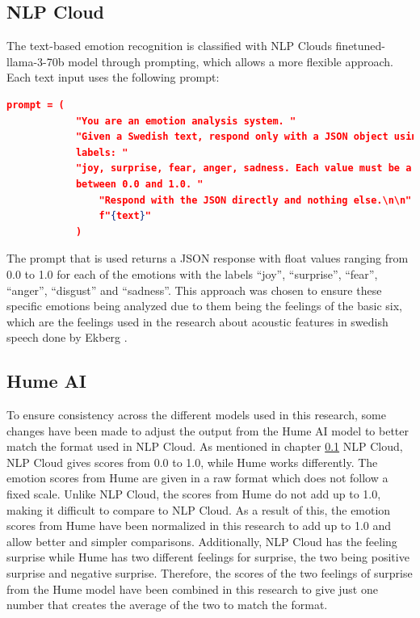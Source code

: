 \subsection{NLP Cloud}
\label{sec:method-nlp}
The text-based emotion recognition is classified with NLP Clouds finetuned-llama-3-70b model
through prompting, which allows a more flexible approach.
Each text input uses the following prompt:
\begin{center}
    \begin{minipage}{0.7\textwidth} 
    \begin{lstlisting}[language=json, caption={NLP Cloud configuration prompt.}]
        prompt = (
            "You are an emotion analysis system. "
            "Given a Swedish text, respond only with a JSON object using these emotion
            labels: "
            "joy, surprise, fear, anger, sadness. Each value must be a float
            between 0.0 and 1.0. "
                "Respond with the JSON directly and nothing else.\n\n"
                f"{text}"
            )
    \end{lstlisting}
    \end{minipage}
\end{center} 
The prompt that is used returns a JSON response with float values ranging from 0.0 to 1.0 for each of
the emotions with the labels “joy”, “surprise”, “fear”, “anger”, “disgust” and “sadness”. This approach
was chosen to ensure these specific emotions being analyzed due to them being the feelings of the basic
six, which are the feelings used in the research about acoustic features in swedish speech done by
Ekberg \autocite{Ekberg2023}. 

\subsection{Hume AI}
To ensure consistency across the different models used in this research, some changes have been
made to adjust the output from the Hume AI model to better match the format used in NLP Cloud.
As mentioned in chapter \ref{sec:method-nlp} NLP Cloud, NLP Cloud gives scores from 0.0 to 1.0, while Hume
works differently. The emotion scores from Hume are given in a raw format which does not follow a
fixed scale. Unlike NLP Cloud, the scores from Hume do not add up to 1.0, making it difficult to
compare to NLP Cloud. As a result of this, the emotion scores from Hume have been normalized in
this research to add up to 1.0 and allow better and simpler comparisons.
Additionally, NLP Cloud has the feeling surprise while Hume has two different feelings for surprise,
the two being positive surprise and negative surprise. Therefore, the scores of the two feelings of
surprise from the Hume model have been combined in this research to give just one number that
creates the average of the two to match the format.

